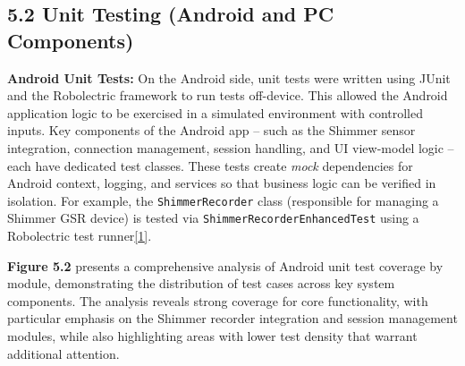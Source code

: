 \documentclass[12pt,a4paper]{article}
\begin{document}
\subsection{5.2 Unit Testing (Android and PC Components)}\label{unit-testing-android-and-pc-components}

\textbf{Android Unit Tests:} On the Android side, unit tests were written using JUnit and the Robolectric framework to run tests off-device. This allowed the Android application logic to be exercised in a simulated environment with controlled inputs. Key components of the Android app -- such as the Shimmer sensor integration, connection management, session handling, and UI view-model logic -- each have dedicated test classes. These tests create \emph{mock} dependencies for Android context, logging, and services so that business logic can be verified in isolation. For example, the \passthrough{\lstinline!ShimmerRecorder!} class (responsible for managing a Shimmer GSR device) is tested via \passthrough{\lstinline!ShimmerRecorderEnhancedTest!} using a Robolectric test runner\href{https://github.com/buccancs/bucika_gsr/blob/7048f7f6a7536f5cd577ed2184800d3dad97fd08/AndroidApp/src/test/java/com/multisensor/recording/recording/ShimmerRecorderEnhancedTest.kt\#L16-L24}{{[}1{]}}.

\textbf{Figure 5.2} presents a comprehensive analysis of Android unit test coverage by module, demonstrating the distribution of test cases across key system components. The analysis reveals strong coverage for core functionality, with particular emphasis on the Shimmer recorder integration and session management modules, while also highlighting areas with lower test density that warrant additional attention.
\end{document}
